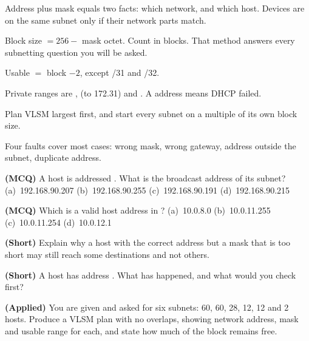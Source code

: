 \begin{chaptersummary}
\begin{tight}
  \item Address plus mask equals two facts: which network, and which host.
        Devices are on the same subnet only if their network parts match.
  \item Block size $=256-$ mask octet. Count in blocks. That method answers every
        subnetting question you will be asked.
  \item Usable $=$ block $-2$, except /31 and /32.
  \item Private ranges are ,  (to 172.31) and
        . A  address means DHCP failed.
  \item Plan VLSM largest first, and start every subnet on a multiple of its own
        block size.
  \item Four faults cover most cases: wrong mask, wrong gateway, address outside
        the subnet, duplicate address.
\end{tight}
\end{chaptersummary}

\begin{reviewq}
  \item \textbf{(MCQ)} A host is addressed . What is the
        broadcast address of its subnet?
        (a)~192.168.90.207 (b)~192.168.90.255 (c)~192.168.90.191 (d)~192.168.90.215
  \item \textbf{(MCQ)} Which is a valid host address in ?
        (a)~10.0.8.0 (b)~10.0.11.255 (c)~10.0.11.254 (d)~10.0.12.1
  \item \textbf{(Short)} Explain why a host with the correct address but a mask
        that is too short may still reach some destinations and not others.
  \item \textbf{(Short)} A host has address . What has
        happened, and what would you check first?
  \item \textbf{(Applied)} You are given  and asked for six
        subnets: 60, 60, 28, 12, 12 and 2 hosts. Produce a VLSM plan with no
        overlaps, showing network address, mask and usable range for each, and
        state how much of the block remains free.
\end{reviewq}
